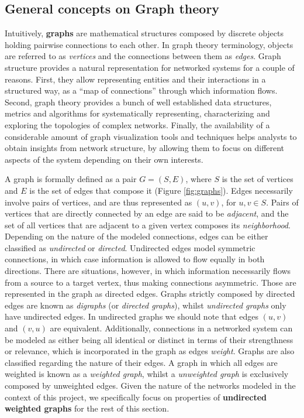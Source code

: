 \subsection{General concepts on Graph theory}
\label{section:graphtheory}

Intuitively, \textbf{graphs} are mathematical structures composed by discrete objects holding pairwise connections to each other. 
In graph theory terminology, objects are referred to as \textit{vertices} and the connections between them as \textit{edges}.
Graph structure provides a natural representation for networked systems for a couple of reasons.
First, they allow representing entities and their interactions in a structured way, as a ``map of connections'' through which information flows.
Second, graph theory provides a bunch of well established data structures, metrics and algorithms for systematically representing, characterizing and exploring the topologies of complex networks.
Finally, the availability of a considerable amount of graph visualization tools and techniques helps analysts to obtain insights from network structure, by allowing them to focus on different aspects of the system depending on their own interests.

A graph is formally defined as a pair $G=(S,E)$, where $S$ is the set of vertices and $E$ is the set of edges that compose it (Figure \ref{fig:graphs}). 
%
Edges necessarily involve pairs of vertices, and are thus represented as $(u,v)$, for $u,v \in S$.
Pairs of vertices that are directly connected by an edge are said to be \textit{adjacent}, and the set of all vertices that are adjacent to a given vertex composes its \textit{neighborhood}.
%
Depending on the nature of the modeled connections, edges can be either classified as \textit{undirected} or \textit{directed}.
Undirected edges model symmetric connections, in which case information is allowed to flow equally in both directions.
There are situations, however, in which information necessarily flows from a source to a target vertex, thus making connections asymmetric.
Those are represented in the graph as directed edges.
Graphs strictly composed by directed edges are known as \textit{digraphs} (or \textit{directed graphs}), whilst \textit{undirected graphs} only have undirected edges.
In undirected graphs we should note that edges $(u,v)$ and $(v,u)$ are equivalent.
%
Additionally, connections in a networked system can be modeled as either being all identical or distinct in terms of their strengthness or relevance, which is incorporated in the graph as edges \textit{weight}.
Graphs are also classified regarding the nature of their edges.
A graph in which all edges are weighted is known as a \textit{weighted graph}, whilst a \textit{unweighted graph} is exclusively composed by unweighted edges.
%
Given the nature of the networks modeled in the context of this project, we specifically focus on properties of \textbf{undirected weighted graphs} for the rest of this section.

